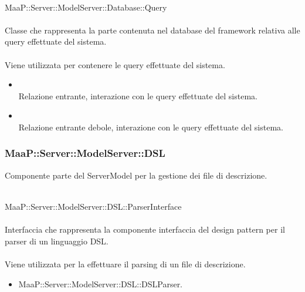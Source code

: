 \\
MaaP::Server::ModelServer::Database::Query\\
\\
Classe che rappresenta la parte contenuta nel database del framework relativa alle query effettuate del sistema.\\
\\
Viene utilizzata per contenere le query effettuate del sistema.\\
\begin{itemize}
\item{}\\
Relazione entrante, interazione con le query effettuate del sistema.
\item{}\\
Relazione entrante debole, interazione con le query effettuate del sistema.
\end{itemize}


\subsubsection{MaaP::Server::ModelServer::DSL}
Componente parte del ServerModel per la gestione dei file di descrizione.

\\
MaaP::Server::ModelServer::DSL::ParserInterface\\
\\
Interfaccia che rappresenta la componente interfaccia del design pattern  per il parser di un linguaggio DSL.\\
\\
Viene utilizzata per la effettuare il parsing di un file di descrizione.\\
\begin{itemize}
\item MaaP::Server::ModelServer::DSL::DSLParser.
\end{itemize}


